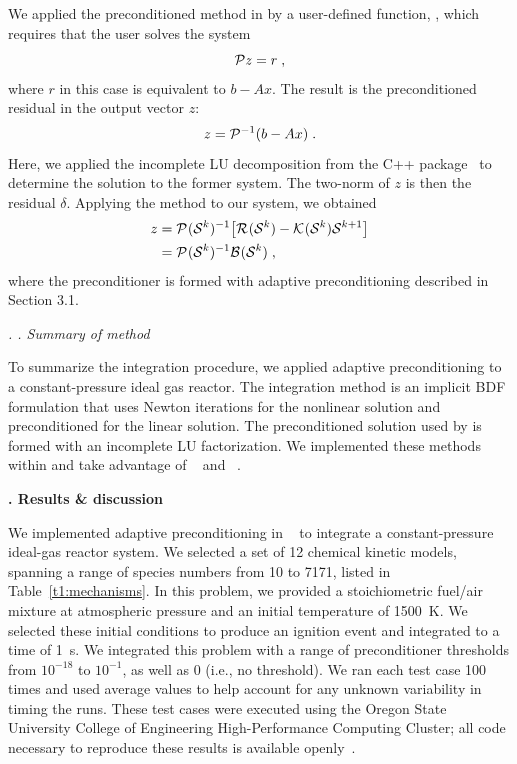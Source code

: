 \documentclass[twocolumn,10pt]{article} %
\renewcommand{\section}%
              [1]%
              {%
               \bgroup%
               \flushleft%
               \small\bf%
               \stepcounter{section}%
               \arabic{section}. #1%
               \par%
               \egroup%
              }%
\renewcommand{\subsection}%
              [1]%
              {%
               \bgroup%
               \flushleft%
               \small\em%
               \stepcounter{subsection}%
               \arabic{section}.%
               \arabic{subsection}. #1%
               \par%
               \egroup%
              }%
\newcommand{\sectionOne}[1]{\section{#1} \addvspace{10pt}}
\newcommand{\sectionTwo}[1]{\subsection{#1} \addvspace{10pt}}
\begin{document}
We applied the preconditioned \gmres{} method in \cvodes{} by a user-defined function, \psolve{}, which requires that the user solves the system
\begin{equation}
    \mathcal{P}{}z = r \;,
\end{equation}
where $r$ in this case is equivalent to $b-Ax$.
The result is the preconditioned residual in the output vector $z$:
\begin{equation}
    z =\mathcal{P}{}^{-1}(b-Ax) \;.
\end{equation}
Here, we applied the incomplete LU decomposition from the \eigen{} C++ package~\cite{guennebaud_eigen_2010} to determine the solution to the former system.
The two-norm of $z$ is then the residual $\delta$.
Applying the \cvodes{} method to our system, we obtained
\begin{align}
    z &= \mathcal{P}^{}(\mathcal{S}^{k})^{-1}\big[\mathcal{R}^{}(\mathcal{S}{}^{k})-\mathcal{K}^{}(\mathcal{S}{}^{k})\mathcal{S}{}^{k+1}\big] \nonumber \\
    &= \mathcal{P}^{}(\mathcal{S}^{k})^{-1}\mathcal{B}^{}(\mathcal{S}{}^{k}) \;,
\end{align}
where the preconditioner is formed with adaptive preconditioning described in Section 3.1.

\sectionTwo{Summary of method}

To summarize the integration procedure, we applied adaptive preconditioning to a constant-pressure ideal gas reactor.
The integration method is an implicit BDF formulation that uses Newton iterations for the nonlinear solution and preconditioned \gmres{} for the linear solution.
The preconditioned solution used by \gmres{} is formed with an incomplete LU factorization.
We implemented these methods within \cantera{} and take advantage of \sundials{}~\cite{hindmarsh_sundials_2005} and \eigen{}~\cite{guennebaud_eigen_2010}.

\sectionOne{Results \& discussion}

We implemented adaptive preconditioning in \cantera{}~\cite{cantera} to integrate a constant-pressure ideal-gas reactor system.
We selected a set of 12 chemical kinetic models, spanning a range of species numbers from 10 to 7171, listed in Table~\ref{t1:mechanisms}.
In this problem, we provided a stoichiometric fuel/air mixture at atmospheric pressure and an initial temperature of \SI{1500}{\kelvin}.
We selected these initial conditions to produce an ignition event and integrated to a time of \SI{1}{\second}.
We integrated this problem with a range of preconditioner thresholds from $10^{-18}$ to $10^{-1}$, as well as 0 (i.e., no threshold).
We ran each test case 100 times and used average values to help account for any unknown variability in timing the runs.
These test cases were executed using the Oregon State University College of Engineering High-Performance Computing Cluster; all code necessary to reproduce these results is available openly~\cite{testing_package}.
\end{document}
